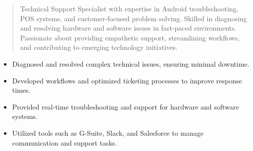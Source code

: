 



\makecvheader

\begin{quote}
  \noindent
  Technical Support Specialist with expertise in Android troubleshooting, POS systems, and customer-focused problem solving. Skilled in diagnosing and resolving hardware and software issues in fast-paced environments. Passionate about providing empathetic support, streamlining workflows, and contributing to emerging technology initiatives.
\end{quote}

\par\smallskip
\noindent
\begin{minipage}{20cm}
  \begin{minipage}{9.75cm}
    \begin{itemize}
      \item Diagnosed and resolved complex technical issues, ensuring minimal downtime.
      \item Developed workflows and optimized ticketing processes to improve response times.
    \end{itemize}
  \end{minipage}
  \hfill
  \begin{minipage}{9.75cm}
    \begin{itemize}
      \item Provided real-time troubleshooting and support for hardware and software systems.
      \item Utilized tools such as G-Suite, Slack, and Salesforce to manage communication and support tasks.
    \end{itemize}
  \end{minipage}
\end{minipage}
\par\smallskip
\divider

